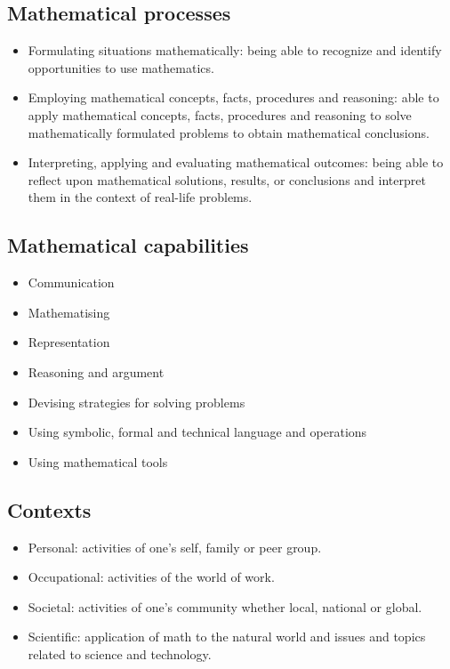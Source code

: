 \documentclass[a4paper, 10pt]{article}
\begin{document}
\subsection{Mathematical processes}
\begin{itemize}
    \item Formulating situations mathematically: being able to recognize and identify opportunities to use mathematics. 
    \item Employing mathematical concepts, facts, procedures and reasoning: able to apply mathematical concepts, facts, procedures and reasoning to solve mathematically formulated problems to obtain mathematical conclusions. 
    \item Interpreting, applying and evaluating mathematical outcomes: being able to reflect upon mathematical solutions, results, or conclusions and interpret them in the context of real-life problems.
\end{itemize}

\subsection{Mathematical capabilities}
\begin{itemize}
    \item Communication
    \item Mathematising
    \item Representation
    \item Reasoning and argument
    \item Devising strategies for solving problems
    \item Using symbolic, formal and technical language and operations
    \item Using mathematical tools
\end{itemize} 

\subsection{Contexts}
\begin{itemize}
    \item Personal: activities of one's self, family or peer group.
    \item Occupational: activities of the world of work.
    \item Societal: activities of one's community whether local, national or global. 
    \item Scientific: application of math to the natural world and issues and topics related to science and technology.
\end{itemize}
\end{document}
